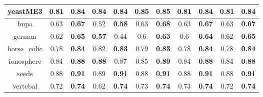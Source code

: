 \documentclass{article}%
\begin{document}
\begin{tabular}{c|cccccccccc}
\hline%
yeastME3&0.81&\textbf{0.84}&0.84&\textbf{0.84}&0.85&\textbf{0.85}&0.81&\textbf{0.84}&0.81&\textbf{0.84}\\%
\hline%
bupa&0.63&\textbf{0.67}&0.52&\textbf{0.58}&0.63&\textbf{0.68}&0.63&\textbf{0.67}&0.63&\textbf{0.67}\\%
\hline%
german&0.62&\textbf{0.65}&\textbf{0.57}&0.44&0.6&\textbf{0.63}&0.6&\textbf{0.64}&0.62&\textbf{0.65}\\%
\hline%
horse\_colic&0.78&\textbf{0.84}&0.82&\textbf{0.83}&0.79&\textbf{0.83}&0.78&\textbf{0.84}&0.78&\textbf{0.84}\\%
\hline%
ionosphere&0.84&\textbf{0.88}&\textbf{0.88}&0.87&0.85&\textbf{0.89}&0.84&\textbf{0.88}&0.84&\textbf{0.88}\\%
\hline%
seeds&0.88&\textbf{0.91}&0.89&\textbf{0.91}&0.88&\textbf{0.91}&0.88&\textbf{0.91}&0.88&\textbf{0.91}\\%
\hline%
vertebal&0.72&\textbf{0.74}&0.62&\textbf{0.74}&0.73&\textbf{0.74}&0.73&\textbf{0.74}&0.72&\textbf{0.74}\\%
\hline%
\end{tabular}

%
\end{document}
